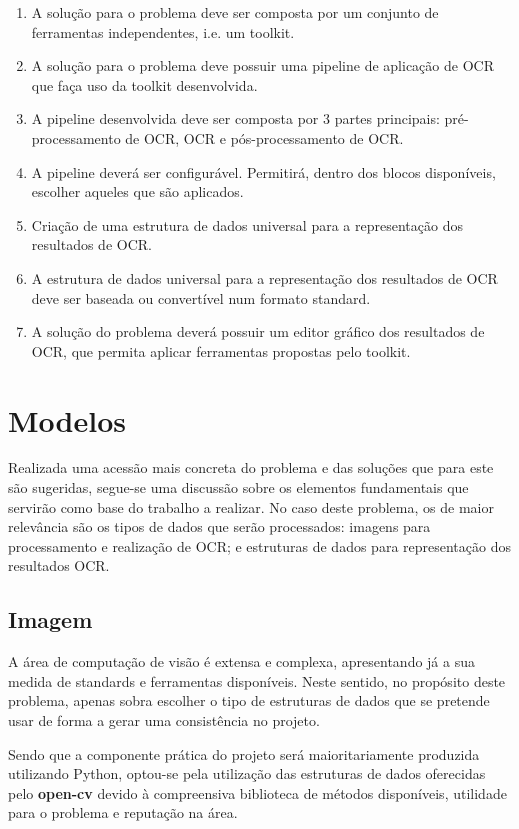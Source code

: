 \begin{enumerate}[label=\textbf{\arabic*}]\setlength\itemsep{-0.8em}
	\item A solução para o problema deve ser composta por um conjunto de ferramentas independentes, i.e. um toolkit.
	\item A solução para o problema deve possuir uma pipeline de aplicação de OCR que faça uso da toolkit desenvolvida.
	\item A pipeline desenvolvida deve ser composta por 3 partes principais: pré-processamento de OCR, OCR e pós-processamento de OCR.
	\item A pipeline deverá ser configurável. Permitirá, dentro dos blocos disponíveis, escolher aqueles que são aplicados.
	\item Criação de uma estrutura de dados universal para a representação dos resultados de OCR.
	\item A estrutura de dados universal para a representação dos resultados de OCR deve ser baseada ou convertível num formato standard.
	\item A solução do problema deverá possuir um editor gráfico dos resultados de OCR, que permita aplicar ferramentas propostas pelo toolkit.
\end{enumerate}


\section{Modelos}

Realizada uma acessão mais concreta do problema e das soluções que para este são sugeridas, segue-se uma discussão sobre os elementos fundamentais que servirão como base do trabalho a realizar. No caso deste problema, os de maior relevância são os tipos de dados que serão processados: imagens para processamento e realização de OCR; e estruturas de dados para representação dos resultados OCR.

\subsection{Imagem}

A área de computação de visão é extensa e complexa, apresentando já a sua medida de standards e ferramentas disponíveis. Neste sentido, no propósito deste problema, apenas sobra escolher o tipo de estruturas de dados que se pretende usar de forma a gerar uma consistência no projeto.

Sendo que a componente prática do projeto será maioritariamente produzida utilizando Python, optou-se pela utilização das estruturas de dados oferecidas pelo \textbf{open-cv} devido à compreensiva biblioteca de métodos disponíveis, utilidade para o problema e reputação na área.

